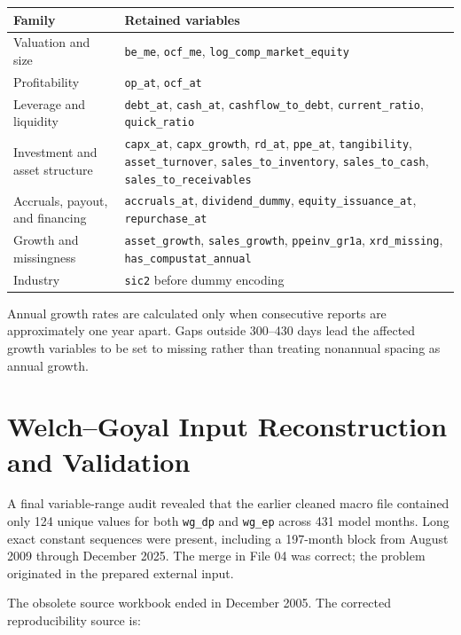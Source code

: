 \documentclass[11pt,a4paper]{article}
\newcommand{\code}[1]{\texttt{#1}}
\begin{document}
\begin{center}
\begin{tabularx}{\textwidth}{p{4.2cm}Y}
\toprule
Family & Retained variables \\
\midrule
Valuation and size & \code{be\_me}, \code{ocf\_me}, \code{log\_comp\_market\_equity} \\
Profitability & \code{op\_at}, \code{ocf\_at} \\
Leverage and liquidity & \code{debt\_at}, \code{cash\_at}, \code{cashflow\_to\_debt}, \code{current\_ratio}, \code{quick\_ratio} \\
Investment and asset structure & \code{capx\_at}, \code{capx\_growth}, \code{rd\_at}, \code{ppe\_at}, \code{tangibility}, \code{asset\_turnover}, \code{sales\_to\_inventory}, \code{sales\_to\_cash}, \code{sales\_to\_receivables} \\
Accruals, payout, and financing & \code{accruals\_at}, \code{dividend\_dummy}, \code{equity\_issuance\_at}, \code{repurchase\_at} \\
Growth and missingness & \code{asset\_growth}, \code{sales\_growth}, \code{ppeinv\_gr1a}, \code{xrd\_missing}, \code{has\_compustat\_annual} \\
Industry & \code{sic2} before dummy encoding \\
\bottomrule
\end{tabularx}
\end{center}

Annual growth rates are calculated only when consecutive reports are approximately one year apart. Gaps outside 300--430 days lead the affected growth variables to be set to missing rather than treating nonannual spacing as annual growth.

\section{Welch--Goyal Input Reconstruction and Validation}

A final variable-range audit revealed that the earlier cleaned macro file contained only 124 unique values for both \code{wg\_dp} and \code{wg\_ep} across 431 model months. Long exact constant sequences were present, including a 197-month block from August 2009 through December 2025. The merge in File 04 was correct; the problem originated in the prepared external input.

The obsolete source workbook  ended in December 2005. The corrected reproducibility source is:
\begin{center}
\end{center}
\end{document}

